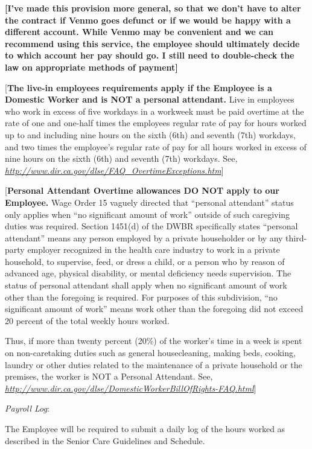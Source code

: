 \documentclass[]{article}
\begin{document}
\textbf{{[}I've made this provision more general, so that we don't have
to alter the contract if Venmo goes defunct or if we would be happy with
a different account. While Venmo may be convenient and we can recommend
using this service, the employee should ultimately decide to which
account her pay should go. I still need to double-check the law on
appropriate methods of payment{]} }

{[}\textbf{The live-in employees requirements apply if the Employee is a
Domestic Worker and is NOT a personal attendant.} Live in employees who
work in excess of five workdays in a workweek must be paid overtime at
the rate of one and one-half times the employees regular rate of pay for
hours worked up to and including nine hours on the sixth (6th) and
seventh (7th) workdays, and two times the employee's regular rate of pay
for all hours worked in excess of nine hours on the sixth (6th) and
seventh (7th) workdays. See,
\href{http://www.dir.ca.gov/dlse/FAQ_OvertimeExceptions.htm}{\emph{http://www.dir.ca.gov/dlse/FAQ\_OvertimeExceptions.htm}}{]}

{[}\textbf{Personal Attendant Overtime allowances DO NOT apply to our
Employee.} Wage Order 15 vaguely directed that ``personal attendant''
status only applies when ``no significant amount of work'' outside of
such caregiving duties was required. Section 1451(d) of the DWBR
specifically states ``personal attendant'' means any person employed by
a private householder or by any third-party employer recognized in the
health care industry to work in a private household, to supervise, feed,
or dress a child, or a person who by reason of advanced age, physical
disability, or mental deficiency needs supervision. The status of
personal attendant shall apply when no significant amount of work other
than the foregoing is required. For purposes of this subdivision, ``no
significant amount of work'' means work other than the foregoing did not
exceed 20 percent of the total weekly hours worked.

Thus, if more than twenty percent (20\%) of the worker's time in a week
is spent on non-caretaking duties such as general housecleaning, making
beds, cooking, laundry or other duties related to the maintenance of a
private household or the premises, the worker is NOT a Personal
Attendant. See,
\href{http://www.dir.ca.gov/dlse/DomesticWorkerBillOfRights-FAQ.html}{\emph{http://www.dir.ca.gov/dlse/DomesticWorkerBillOfRights-FAQ.html}}{]}

\emph{Payroll Log}:

The Employee will be required to submit a daily log of the hours worked
as described in the Senior Care Guidelines and Schedule.
\end{document}

